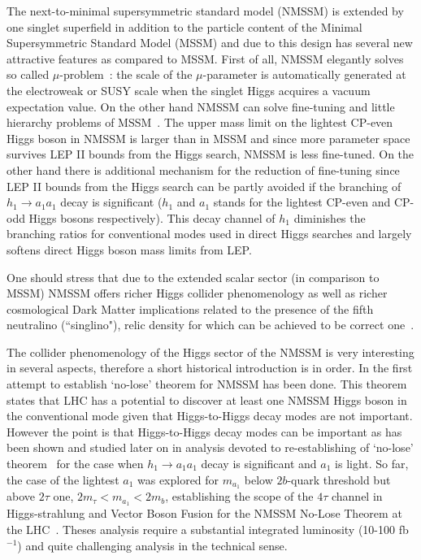 \documentclass[aps,12pt,superscriptaddress,nofootinbib,floatfix,showpacs]{revtex4}
\begin{document}
The next-to-minimal supersymmetric standard model (NMSSM)
\cite{Nilles:1982dy,Frere:1983ag,Ellis:1988er,%
Drees:1988fc,Ellwanger:1993hn,Ellwanger:1993xa,%
Elliott:1993bs,Pandita:1993tg,Ellwanger:1995ru,%
King:1995vk,Franke:1995tc,Ellwanger:1996gw,Miller:2003ay}
is extended by one singlet superfield in addition to the particle content
of the Minimal Supersymmetric Standard Model (MSSM)
and due to this design 
has several new attractive features as compared to MSSM.
First  of all, NMSSM elegantly solves so called $\mu$-problem~\cite{mu-problem}:
the scale of the $\mu$-parameter is automatically generated 
at the electroweak or SUSY  scale when the singlet Higgs acquires 
a vacuum expectation value.
On the other hand NMSSM can solve fine-tuning and little hierarchy problems
of MSSM~\cite{Dermisek:2005ar}.
The upper mass limit on the lightest  CP-even
Higgs boson in NMSSM is larger than in MSSM and since more
parameter space survives LEP II bounds from the Higgs search,  NMSSM
is less fine-tuned.
On the other hand  there is additional mechanism for the reduction of
fine-tuning since 
LEP II bounds from the Higgs search can be partly avoided if the
branching of  $h_1\to a_1 a_1$ decay is significant ($h_1$ and
$a_1$ stands for the lightest   CP-even  and CP-odd Higgs bosons respectively).
This decay channel of $h_1$ diminishes the branching ratios for
conventional modes used in direct Higgs  searches and largely softens
direct Higgs boson mass limits from LEP. 

One should stress that due to the extended scalar sector (in comparison to MSSM)
NMSSM offers richer Higgs collider phenomenology
\cite{nmssm-ph1,nmssm-ph2,%
nmssm-ph2b,nmssm-ph3,nmssm-ph4,%
nmssm-ph5,nmssm-ph6,nmssm-ph6a,nmssm-ph7}
as well as richer  cosmological Dark Matter implications 
related to the presence of the fifth  neutralino (``singlino"),
relic density for  which can be achieved to be correct one~\cite{nmssm-dm}.

The collider phenomenology of the Higgs sector of the NMSSM
is very interesting in several aspects, therefore a short historical 
introduction is in  order.
In \cite{nmssm-ph2} the first attempt to establish `no-lose' theorem for NMSSM
has been done. This theorem states that LHC has a potential to discover at least one
NMSSM Higgs boson in the conventional mode given that Higgs-to-Higgs decay modes 
are not important. However the point is that  Higgs-to-Higgs decay modes
can be important as has been shown and studied later on
in analysis devoted to re-establishing   of `no-lose' 
theorem~\cite{nmssm-ph2b,nmssm-ph3,nmssm-ph4,nmssm-ph5,nmssm-ph6,nmssm-ph6a,nmssm-ph7}
for the case when  $h_1\to a_1 a_1$ decay is significant
and $a_1$ is light. So far, the case of the lightest $a_1$  was explored 
for $m_{a_1}$ below $2b$-quark threshold but above $2\tau$ one,
$2m_\tau <m_{a_1}<2m_b$, establishing the scope of
the $4\tau$ channel in Higgs-strahlung and Vector Boson Fusion
for the NMSSM No-Lose Theorem at the LHC~\cite{nmssm-ph7}.
Theses analysis  require a substantial integrated luminosity (10-100 fb$^{-1}$)
and quite challenging analysis in the technical sense.
\end{document}
